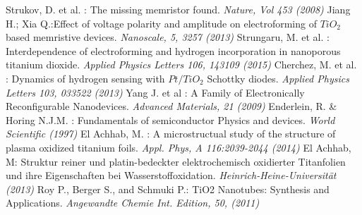 \documentclass[12pt]{article}
\begin{document}
\newpage
\begin{thebibliography}{}

						Strukov, D. et al. : The missing memristor found.					
						{\sl Nature, Vol 453 (2008)}
						Jiang H.; Xia Q.:Effect of voltage polarity and amplitude on electroforming of $TiO_2$ based memristive devices. 						
						{\sl Nanoscale, 5, 3257 (2013)}
						Strungaru, M. et al. : Interdependence of electroforming and hydrogen incorporation in nanoporous titanium dioxide.
						{\sl Applied Physics Letters 106, 143109 (2015)}
						Cherchez, M. et al. : Dynamics of hydrogen sensing with $Pt/TiO_2$ Schottky diodes.
						{\sl Applied Physics Letters 103, 033522 (2013)}
						Yang J. et al : A Family of Electronically Reconfigurable Nanodevices.
						{\sl Advanced Materials, 21 (2009)}
						Enderlein, R. \& Horing N.J.M. : Fundamentals of semiconductor Physics and devices.
						{\sl World Scientific (1997)}
						El Achhab, M. : A microstructual study of the structure of plasma oxidized titanium foils.
						{\sl Appl. Phys, A 116:2039-2044 (2014)}
						El Achhab, M: Struktur reiner und platin-bedeckter elektrochemisch oxidierter Titanfolien und ihre Eigenschaften bei Wasserstoffoxidation.
						{\sl Heinrich-Heine-Universität (2013)}
						Roy P.,  Berger S., and  Schmuki P.: TiO2 Nanotubes: Synthesis and Applications.
						{\sl Angewandte Chemie Int. Edition, 50, (2011)}


\end{thebibliography}
\end{document}
